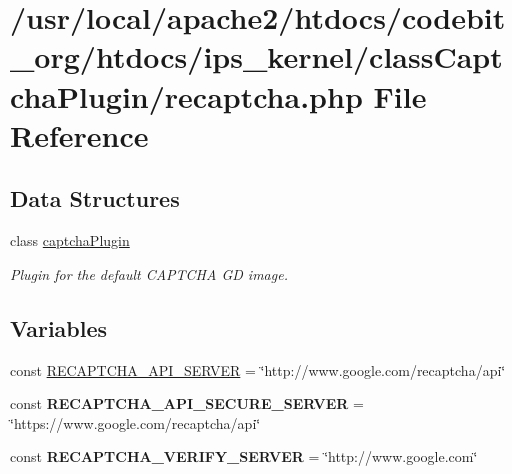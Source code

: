 \hypertarget{recaptcha_8php}{\section{/usr/local/apache2/htdocs/codebit\-\_\-org/htdocs/ips\-\_\-kernel/class\-Captcha\-Plugin/recaptcha.php File Reference}
\label{recaptcha_8php}
}
\subsection*{Data Structures}
\begin{DoxyCompactItemize}
\item 
class \hyperlink{classcaptcha_plugin}{captcha\-Plugin}
\begin{DoxyCompactList}\small\item\em Plugin for the default C\-A\-P\-T\-C\-H\-A G\-D image. \end{DoxyCompactList}\end{DoxyCompactItemize}
\subsection*{Variables}
\begin{DoxyCompactItemize}
\item 
const \hyperlink{recaptcha_8php_a938a359c9dabc1c4764f1ae089767e68}{R\-E\-C\-A\-P\-T\-C\-H\-A\-\_\-\-A\-P\-I\-\_\-\-S\-E\-R\-V\-E\-R} = \char`\"{}http\-://www.\-google.\-com/recaptcha/api\char`\"{}
\item 
\hypertarget{recaptcha_8php_a3551aaabe3cb97f711d8b756e8a9d56c}{const {\bfseries R\-E\-C\-A\-P\-T\-C\-H\-A\-\_\-\-A\-P\-I\-\_\-\-S\-E\-C\-U\-R\-E\-\_\-\-S\-E\-R\-V\-E\-R} = \char`\"{}https\-://www.\-google.\-com/recaptcha/api\char`\"{}}\label{recaptcha_8php_a3551aaabe3cb97f711d8b756e8a9d56c}

\item 
\hypertarget{recaptcha_8php_a32b0fceb04409af8a70275dd91626de7}{const {\bfseries R\-E\-C\-A\-P\-T\-C\-H\-A\-\_\-\-V\-E\-R\-I\-F\-Y\-\_\-\-S\-E\-R\-V\-E\-R} = \char`\"{}http\-://www.\-google.\-com\char`\"{}}\label{recaptcha_8php_a32b0fceb04409af8a70275dd91626de7}

\end{DoxyCompactItemize}


